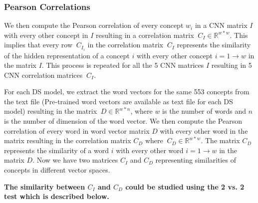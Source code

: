 \subsubsection{Pearson Correlations}
We then compute the Pearson correlation of every concept $w_i$ in a CNN matrix $I$ with every other concept in $I$ resulting in a correlation matrix $\ C_I\in \mathbb{R} ^{w*w}$. This implies that every row $\ C_{I_i}$ in the correlation matrix $\ C_I$ represents the similarity of the hidden representation of a concept $i$ with every other concept $i=1\rightarrow w$ in the matrix $I$. This process is repeated for all the 5 CNN matrices $I$ resulting in 5 CNN correlation matrices $\ C_I$.

For each DS model, we extract the word vectors for the same 553 concepts from the text file (Pre-trained word vectors are available as text file for each DS model) resulting in the matrix $\ D\in \mathbb{R} ^{w*n}$, where $w$ is the number of words and $n$ is the number of dimension of the word vector. We then compute the Pearson correlation of every word in word vector matrix $D$ with every other word in the matrix resulting in the correlation matrix $C_D$ where $\ C_D\in \mathbb{R} ^{w*w} $. The matrix $C_D$ represents the similarity of a word $i$ with every other word $i=1\rightarrow w$ in the matrix $D$. Now we have two matrices $C_I$ and $C_D$ representing similarities of concepts in different vector spaces. 
\newpage

\textbf{The similarity between $C_I$ and $C_D$ could be studied using the 2 vs. 2 test which is described below.}

